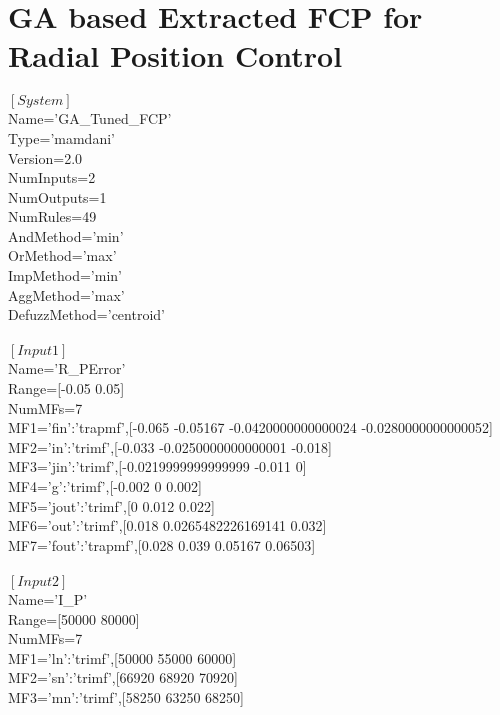 \newappendix\label{firstappendix}

\section{GA based Extracted FCP for Radial Position Control}
$ [System] $\\
Name='GA\_Tuned\_FCP'\\
Type='mamdani'\\
Version=2.0\\
NumInputs=2\\
NumOutputs=1\\
NumRules=49\\
AndMethod='min'\\
OrMethod='max'\\
ImpMethod='min'\\
AggMethod='max'\\
DefuzzMethod='centroid'\\
\\
$ [Input1] $\\
Name='R\_PError'\\
Range=[-0.05 0.05]\\
NumMFs=7\\
MF1='fin':'trapmf',[-0.065 -0.05167 -0.0420000000000024 -0.0280000000000052]\\
MF2='in':'trimf',[-0.033 -0.0250000000000001 -0.018]\\
MF3='jin':'trimf',[-0.0219999999999999 -0.011 0]\\
MF4='g':'trimf',[-0.002 0 0.002]\\
MF5='jout':'trimf',[0 0.012 0.022]\\
MF6='out':'trimf',[0.018 0.0265482226169141 0.032]\\
MF7='fout':'trapmf',[0.028 0.039 0.05167 0.06503]\\
\\
$ [Input2] $\\
Name='I\_P'\\
Range=[50000 80000]\\
NumMFs=7\\
MF1='ln':'trimf',[50000 55000 60000]\\
MF2='sn':'trimf',[66920 68920 70920]\\
MF3='mn':'trimf',[58250 63250 68250]\\
